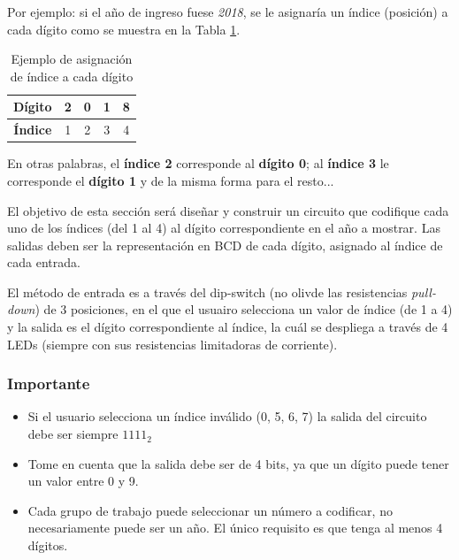 \vspace{14pt}

Por ejemplo: si el año de ingreso fuese \emph{2018}, se le asignaría un índice (posición) a cada dígito como se
muestra en la Tabla \ref{Table:ejemploIndices}.

\begin{table}[H]
    \centering
    \begin{tabular}{|c|c|c|c|c|}
        \hline
        \textbf{Dígito} & 2 & 0 & 1 & 8 \\ \hline
        \textbf{Índice}  & 1 & 2 & 3 & 4 \\ \hline
    \end{tabular}
    \caption{Ejemplo de asignación de índice a cada dígito}
    \label{Table:ejemploIndices}
\end{table}


En otras palabras, el \textbf{índice 2} corresponde al \textbf{dígito 0}; al \textbf{índice 3} le corresponde el \textbf{dígito 1} y de la misma forma para el resto...

\vspace{14 pt}

El objetivo de esta sección será diseñar y construir un circuito que codifique cada uno de los índices (del 1 al 4) al dígito correspondiente en el año a mostrar.
Las salidas deben ser la representación en BCD de cada dígito, asignado al índice de cada entrada.

\vspace{14 pt}

El método de entrada es a través del dip-switch (no olivde las resistencias \emph{pull-down}) de 3 posiciones, en el que el usuairo
selecciona un valor de índice (de 1 a 4) y la salida es el dígito correspondiente al índice,
la cuál se despliega a través de 4 LEDs (siempre con sus resistencias limitadoras de corriente).

\subsubsection*{Importante}
\begin{itemize}
    \item Si el usuario selecciona un índice inválido (0, 5, 6, 7) la salida del circuito debe ser siempre $1111_2$
    \item Tome en cuenta que la salida debe ser de 4 bits, ya que un dígito puede tener un valor entre 0 y 9.
    \item Cada grupo de trabajo puede seleccionar un número a codificar, no necesariamente puede ser un año. El único requisito es que tenga al menos 4 dígitos.
\end{itemize}

